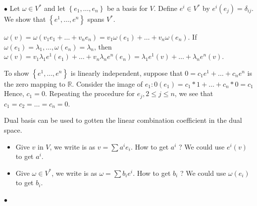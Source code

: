 \documentclass[12pt]{article} %
\begin{document}
$\bullet$ 
Let $\omega \in V^{*}$ and let $\left\{e_{1}, \ldots, e_{n}\right\}$ be a basis for $V$. Define $e^{i} \in V^{*}$ by $e^{i}\left(e_{j}\right)=\delta_{i j}$. We show that $\left\{e^{1}, \ldots, e^{n}\right\}$ spans $V^{*}$. 

$\omega(v)=\omega\left(v_{1} e_{1}+\ldots+v_{n} e_{n}\right)=v_{1} \omega\left(e_{1}\right)+\ldots+v_{n} \omega\left(e_{n}\right)$. If $\omega\left(e_{1}\right)=\lambda_{1}, \ldots, \omega\left(e_{n}\right)=\lambda_{n}$, then $\omega(v)=v_{1} \lambda_{1} e^{1}\left(e_{1}\right)+\ldots+v_{n} \lambda_{n} e^{n}\left(e_{n}\right)=\lambda_{1} e^{1}(v)+\ldots+\lambda_{n} e^{n}(v)$.

To show $\left\{e^{1}, \ldots, e^{n}\right\}$ is linearly independent, suppose that $0=c_{1} e^{1}+\ldots+c_{n} e^{n}$ is the zero mapping to $\mathbb{R}$. Consider the image of $e_{1}: 0\left(e_{1}\right)=c_{1} * 1+\ldots+c_{n} * 0=c_{1}$ Hence, $c_{1}=0$. Repeating the procedure for $e_{j}, 2 \leq j \leq n$, we see that $c_{1}=c_{2}=\ldots=c_{n}=0$.

\begin{rema}\label{re:fytrw}
Dual basis can be used to gotten the linear combination coefficient in the dual space.
\begin{itemize}
    \item Give $v$ in $V$, we write is as $v=\sum a^{i} e_{i}$. How to get $a^{i}$ ? We could use $e^{i}(v)$ to get $a^{i}$.
    \item Give $\omega \in V^{*}$, we write is as $\omega=\sum b_{i} e^{i}$. How to get $b_{i}$ ? We could use $\omega\left(e_{i}\right)$ to get $b_{i}$.
\end{itemize}

\end{rema}

$\bullet$ 
\end{document}
